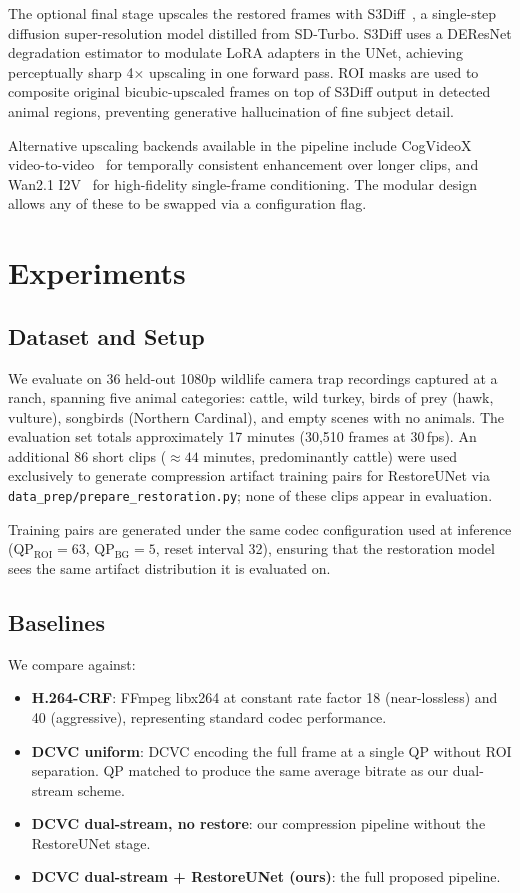 \documentclass[10pt, conference]{IEEEtran}
\begin{document}
The optional final stage upscales the restored frames with S3Diff~\cite{Zhang_2024_S3Diff}, a single-step diffusion super-resolution model distilled from SD-Turbo. S3Diff uses a DEResNet degradation estimator to modulate LoRA adapters in the UNet, achieving perceptually sharp 4$\times$ upscaling in one forward pass. ROI masks are used to composite original bicubic-upscaled frames on top of S3Diff output in detected animal regions, preventing generative hallucination of fine subject detail.

Alternative upscaling backends available in the pipeline include CogVideoX video-to-video~\cite{Yang_2024_CogVideoX} for temporally consistent enhancement over longer clips, and Wan2.1 I2V~\cite{Wan_2025} for high-fidelity single-frame conditioning. The modular design allows any of these to be swapped via a configuration flag.


\section{Experiments}
\label{sec:experiments}

\subsection{Dataset and Setup}

We evaluate on 36 held-out 1080p wildlife camera trap recordings captured at a ranch, spanning five animal categories: cattle, wild turkey, birds of prey (hawk, vulture), songbirds (Northern Cardinal), and empty scenes with no animals. The evaluation set totals approximately 17 minutes (30,510 frames at 30\,fps). An additional 86 short clips (${\approx}44$ minutes, predominantly cattle) were used exclusively to generate compression artifact training pairs for RestoreUNet via \texttt{data\_prep/prepare\_restoration.py}; none of these clips appear in evaluation.

Training pairs are generated under the same codec configuration used at inference (QP$_{\text{ROI}}{=}63$, QP$_{\text{BG}}{=}5$, reset interval 32), ensuring that the restoration model sees the same artifact distribution it is evaluated on.

\subsection{Baselines}

We compare against:
\begin{itemize}
    \item \textbf{H.264-CRF}: FFmpeg libx264 at constant rate factor 18 (near-lossless) and 40 (aggressive), representing standard codec performance.
    \item \textbf{DCVC uniform}: DCVC encoding the full frame at a single QP without ROI separation. QP matched to produce the same average bitrate as our dual-stream scheme.
    \item \textbf{DCVC dual-stream, no restore}: our compression pipeline without the RestoreUNet stage.
    \item \textbf{DCVC dual-stream + RestoreUNet (ours)}: the full proposed pipeline.
\end{itemize}
\end{document}
